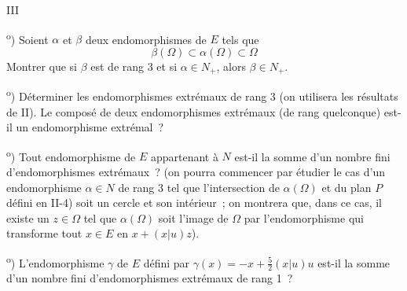 \documentclass[a4paper,11pt]{article}
\newcommand{\partie}[1]{\par\bigskip\centerline{#1}\medskip}
\newcommand{\q}[1]{\par\smallskip\noindent#1\textsuperscript{o})}
\begin{document}
\partie{III}

\q1 Soient $\alpha$ et $\beta$ deux endomorphismes de $E$ tels que
\[
  \beta(\Omega)\subset\alpha(\Omega)\subset\Omega
\]
Montrer que si $\beta$ est de rang 3 et si $\alpha\in N_+$, alors $\beta\in N_+$.

\q2 Déterminer les endomorphismes extrémaux de rang 3 (on utilisera les résultats de II). Le composé de deux endomorphismes extrémaux (de rang quelconque) est-il un endomorphisme extrémal~?

\q3 Tout endomorphisme de $E$ appartenant à $N$ est-il la somme d'un nombre fini d'endomorphismes extrémaux~? (on pourra commencer par étudier le cas d'un endomorphisme $\alpha\in N$ de rang 3 tel que l'intersection de $\alpha(\Omega)$ et du plan $P$ défini en II-4) soit un cercle et son intérieur~; on montrera que, dans ce cas, il existe un $z\in\Omega$ tel que $\alpha(\Omega)$ soit l'image de $\Omega$ par l'endomorphisme qui transforme tout $x\in E$ en $x+(x|u)z$).

\q4 L'endomorphisme $\gamma$ de $E$ défini par $\gamma(x)=-x+\frac52(x|u)u$ est-il la somme d'un nombre fini d'endomorphismes extrémaux de rang 1~?
\end{document}
